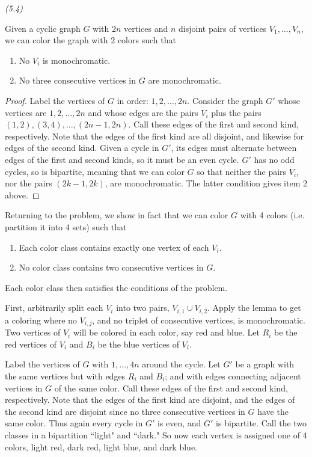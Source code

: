 \begin{problem} {\it (5.4)}
\begin{lem}
Given a cyclic graph $G$ with $2n$ vertices and $n$ disjoint pairs of vertices $V_1, \ldots, V_n$, we can color the graph with 2 colors such that
\begin{enumerate}
\item
No $V_i$ is monochromatic.
\item
No three consecutive vertices in $G$ are monochromatic.
\end{enumerate}
\end{lem}
\begin{proof}
Label the vertices of $G$ in order: $1,2,\ldots, 2n$. 
Consider the graph $G'$ whose vertices are $1,2,\ldots, 2n$ and whose edges are the pairs $V_i$ plus the pairs $(1,2),(3,4),\ldots, (2n-1,2n)$. Call these edges of the first and second kind, respectively. Note that the edges of the first kind are all disjoint, and likewise for edges of the second kind. Given a cycle in $G'$, its edges must alternate between edges of the first and second kinds, so it must be an even cycle. $G'$ has no odd cycles, so is bipartite, meaning that we can color $G$ so that neither the pairs $V_i$, nor the pairs $(2k-1,2k)$, are monochromatic. The latter condition gives item 2 above.
\end{proof}
Returning to the problem, we show in fact that we can color $G$ with 4 colors (i.e. partition it into 4 sets) such that
\begin{enumerate}
\item
Each color class contains exactly one vertex of each $V_i$.
\item 
No color class contains two consecutive vertices in $G$.
\end{enumerate}
Each color class then satisfies the conditions of the problem.

First, arbitrarily split each $V_i$ into two pairs, $V_{i,1}\cup V_{i,2}$. Apply the lemma to get a coloring where no $V_{i,j}$, and no triplet of consecutive vertices, is monochromatic. Two vertices of $V_i$ will be colored in each color, say red and blue. Let $R_i$ be the red vertices of $V_i$ and $B_i$ be the blue vertices of $V_i$.

Label the vertices of $G$ with $1,\ldots, 4n$ around the cycle. Let $G'$ be a graph with the same vertices but with edges $R_i$ and $B_i$; and with edges connecting adjacent vertices in $G$ of the same color. Call these edges of the first and second kind, respectively. Note that the edges of the first kind are disjoint, and the edges of the second kind are disjoint since no three consecutive vertices in $G$ have the same color. Thus again every cycle in $G'$ is even, and $G'$ is bipartite. Call the two classes in a bipartition ``light" and ``dark." So now each vertex is assigned one of 4 colors, light red, dark red, light blue, and dark blue.


\end{problem}
